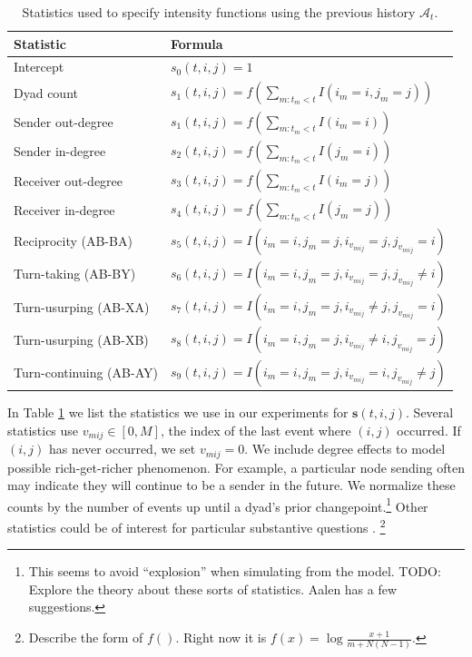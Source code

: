 \documentclass{article}
\begin{document}
\begin{table}[t]
\footnotesize
\center
\begin{tabular}{|l|l|}
\hline
Statistic & Formula \\
\hline
\hline
Intercept& $s_{0}(t,i,j) = 1$\\
Dyad count& $s_{1}(t,i,j) = f(\sum_{m:t_m<t} I(i_m=i,j_m=j) )$\\
Sender out-degree& $s_{1}(t,i,j) = f(\sum_{m:t_m<t} I(i_m=i) )$\\
Sender in-degree& $s_{2}(t,i,j) = f(\sum_{m:t_m<t} I(j_m=i) )$\\
Receiver out-degree& $s_{3}(t,i,j) = f(\sum_{m:t_m<t} I(i_m=j))$\\
Receiver in-degree& $s_{4}(t,i,j) = f(\sum_{m:t_m<t} I(j_m=j))$\\
Reciprocity (AB-BA)& $s_{5}(t,i,j) = I(i_m=i,j_m=j,i_{v_{mij}}=j,j_{v_{mij}}=i)$\\
Turn-taking (AB-BY)&$s_{6}(t,i,j) = I(i_m=i,j_m=j,i_{v_{mij}}=j,j_{v_{mij}}\ne i)$\\
Turn-usurping (AB-XA)& $s_{7}(t,i,j) = I(i_m=i,j_m=j,i_{v_{mij}} \ne j,j_{v_{mij}}=i)$\\
Turn-usurping (AB-XB)&$s_{8}(t,i,j) = I(i_m=i,j_m=j,i_{v_{mij}} \ne i,j_{v_{mij}}=j)$\\
Turn-continuing (AB-AY)& $s_{9}(t,i,j) =  I(i_m=i,j_m=j,i_{v_{mij}}=i,j_{v_{mij}}\ne j)$\\
\hline
\end{tabular}
\label{tab:stats}
\caption{Statistics used to specify intensity functions using the previous history $\mathcal{A}_t$.}
\end{table}



In Table \ref{tab:stats} we list the statistics we use in our experiments for  $\mathbf{s}(t,i,j)$.  Several statistics use $v_{mij} \in [0,M]$, the index of the last event where $(i,j)$ occurred.  %
If $(i,j)$ has never occurred, we set $v_{mij}=0$.  We include degree effects to model possible rich-get-richer phenomenon.  For example, a particular node sending often may indicate they will continue to be a sender in the future.  We normalize these counts by the number of events up until a dyad's prior changepoint.\footnote{This seems to avoid ``explosion'' when simulating from the model.  TODO: Explore the theory about these sorts of statistics.  Aalen has a few suggestions.} Other statistics could be of interest for particular substantive questions \cite{Butts2008,Vu2011}.  \footnote{Describe the form of $f()$.  Right now it is $f(x) = \log \frac{x+1}{m + N(N-1)}$.}
\end{document}

